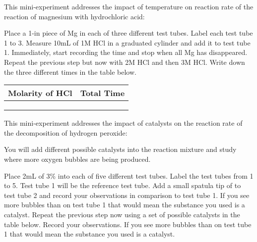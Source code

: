 \documentclass[main.tex]{subfiles}
\begin{document}
\vspace{0.2cm}{\large \bfseries 2. Factors that affect the chemical rate. Effect of reactant concentration}
This mini-experiment addresses the impact of temperature on reaction rate of the reaction of magnesium with hydrochloric acid:
\begin{center}\end{center}
\begin{steps}
    \newstep[] Place a 1-in piece of Mg in each of three different test tubes. Label each test tube 1 to 3.
    \newstep[] Measure 10mL of 1M HCl in a graduated cylinder and add it to test tube 1. Immediately, start recording the time and stop when all Mg has disappeared.
        \newstep[]  Repeat the previous step but now with 2M HCl and then 3M HCl. Write down the three different times in the table below.
\end{steps}
\begin{center}\begin{tabular}{ |p{4cm}|p{8cm}|  }
\hline
     Molarity of HCl&   Total Time           \\
\hline
   \vspace{0cm}\vspace{.25cm} &               \\\hline
   \vspace{0cm}\vspace{.25cm} &             \\\hline
      \vspace{0cm}\vspace{.25cm} &             \\\hline

\end{tabular}\end{center}
\vspace{0.2cm}{\large \bfseries 3. Factors that affect the chemical rate. Presence of a catalyst.}
This mini-experiment addresses the impact of catalysts on the reaction rate of the decomposition of hydrogen peroxide:
\begin{center}\end{center}
You will add different possible catalysts into the reaction mixture and study where more oxygen bubbles are being produced.
\begin{steps}
    \newstep[] Place 2mL of 3\%  into each of five different test tubes. Label the test tubes from 1 to 5. Test tube 1 will be the reference test tube.
    \newstep[] Add a small spatula tip of  to test tube 2 and record your observations in comparison to test tube 1.  If you see more bubbles than on test tube 1 that would mean the substance you used is a catalyst.
        \newstep[]  Repeat the previous step now using a set of possible catalysts in the table below. Record your observations. If you see more bubbles than on test tube 1 that would mean the substance you used is a catalyst.
        \end{steps}
\end{document}
